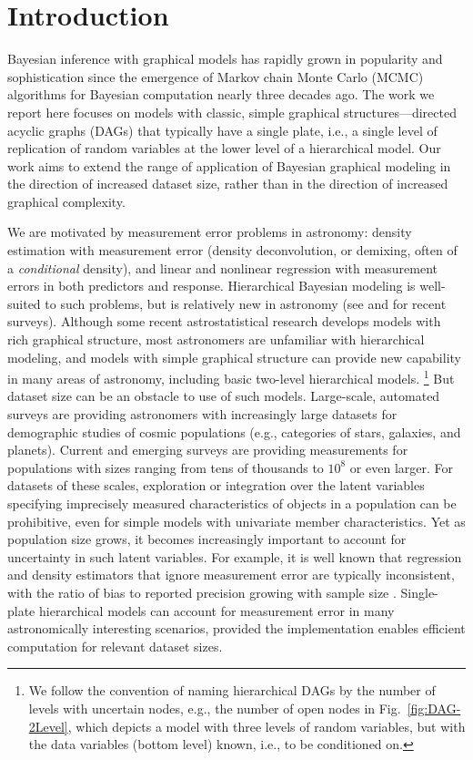 \section{Introduction}
\label{sec:intro}

Bayesian inference with graphical models has rapidly grown in popularity and sophistication since the emergence of Markov chain Monte Carlo (MCMC) algorithms for Bayesian computation nearly three decades ago.
The work we report here focuses on models with classic, simple graphical structures---directed acyclic graphs (DAGs) that typically have a single plate, i.e., a single level of replication of random variables at the lower level of a hierarchical model.
Our work aims to extend the range of application of Bayesian graphical modeling in the direction of increased dataset size, rather than in the direction of increased graphical complexity.

We are motivated by measurement error problems in astronomy: density estimation with measurement error (density deconvolution, or demixing, often of a \emph{conditional} density), and linear and nonlinear regression with measurement errors in both predictors and response.
Hierarchical Bayesian modeling is well-suited to such problems, but is relatively new in astronomy (see \citealt{kelly-measurement2012} and \citealt{loredo2013survey} for recent surveys).
Although some recent astrostatistical research develops models with rich graphical structure, most astronomers are unfamiliar with hierarchical modeling, and models with simple graphical structure can provide new capability in many areas of astronomy, including basic two-level hierarchical models.%
\footnote{We follow the convention of naming hierarchical DAGs by the number of levels with uncertain nodes, e.g., the number of open nodes in Fig.~\ref{fig:DAG-2Level}, which depicts a model with three levels of random variables, but with the data variables (bottom level) known, i.e., to be conditioned on.}
But dataset size can be an obstacle to use of such models.
Large-scale, automated surveys are providing astronomers with increasingly large datasets for demographic studies of cosmic populations (e.g., categories of stars, galaxies, and planets).
Current and emerging surveys are providing measurements for populations with sizes ranging from tens of thousands to $10^8$ or even larger.
For datasets of these scales, exploration or integration over the latent variables specifying imprecisely measured characteristics of objects in a population can be prohibitive, even for simple models with univariate member characteristics.
Yet as population size grows, it becomes increasingly important to account for uncertainty in such latent variables.
For example, it is well known that regression and density estimators that ignore measurement error are typically inconsistent, with the ratio of bias to reported precision growing with sample size \citep{C+06-MsmtErr}.
Single-plate hierarchical models can account for measurement error in many astronomically interesting scenarios, provided the implementation enables efficient computation for relevant dataset sizes.

